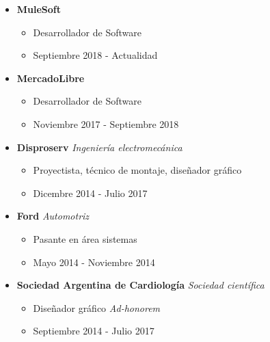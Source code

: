\newcommand\job[4]{
    \item \textbf{#1} \textit{#2} 
        \begin{itemize}
            \item #3
            \item #4
        \end{itemize}
}
\begin{itemize}
    \job{MuleSoft}{}{Desarrollador de Software}{Septiembre 2018 - Actualidad}
    \job{MercadoLibre}{}{Desarrollador de Software}{Noviembre 2017 - Septiembre 2018}
    \job{Disproserv}{Ingeniería electromecánica}{Proyectista, técnico de montaje, diseñador gráfico}{Dicembre 2014 - Julio 2017}
    \job{Ford}{Automotriz}{Pasante en área sistemas}{Mayo 2014 - Noviembre 2014}
    \job{Sociedad Argentina de Cardiología}{Sociedad científica}{Diseñador gráfico
    \textit{Ad-honorem}}{Septiembre 2014 - Julio 2017}
\end{itemize}
